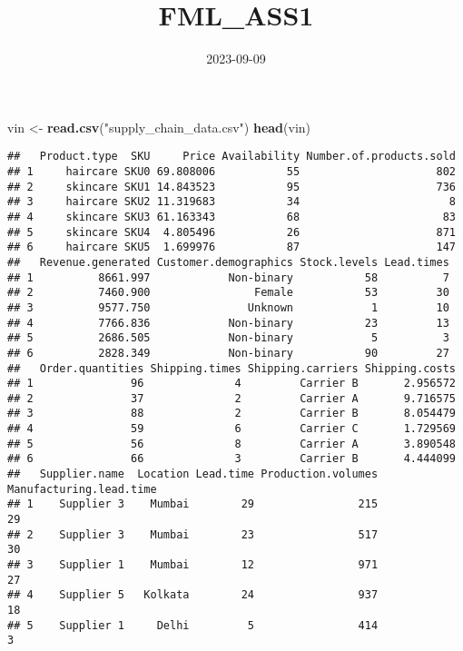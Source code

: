 \documentclass[
]{article}
\title{FML\_ASS1}
\author{}
\date{\vspace{-2.5em}2023-09-09}
\newenvironment{Shaded}{\begin{snugshade}}{\end{snugshade}}
\newcommand{\FunctionTok}[1]{\textcolor[rgb]{0.13,0.29,0.53}{\textbf{#1}}}
\newcommand{\NormalTok}[1]{#1}
\newcommand{\OtherTok}[1]{\textcolor[rgb]{0.56,0.35,0.01}{#1}}
\newcommand{\StringTok}[1]{\textcolor[rgb]{0.31,0.60,0.02}{#1}}
\begin{document}
\maketitle

\begin{Shaded}
\begin{Highlighting}[]
\NormalTok{vin }\OtherTok{\textless{}{-}} \FunctionTok{read.csv}\NormalTok{(}\StringTok{"supply\_chain\_data.csv"}\NormalTok{)}
\FunctionTok{head}\NormalTok{(vin)}
\end{Highlighting}
\end{Shaded}

\begin{verbatim}
##   Product.type  SKU     Price Availability Number.of.products.sold
## 1     haircare SKU0 69.808006           55                     802
## 2     skincare SKU1 14.843523           95                     736
## 3     haircare SKU2 11.319683           34                       8
## 4     skincare SKU3 61.163343           68                      83
## 5     skincare SKU4  4.805496           26                     871
## 6     haircare SKU5  1.699976           87                     147
##   Revenue.generated Customer.demographics Stock.levels Lead.times
## 1          8661.997            Non-binary           58          7
## 2          7460.900                Female           53         30
## 3          9577.750               Unknown            1         10
## 4          7766.836            Non-binary           23         13
## 5          2686.505            Non-binary            5          3
## 6          2828.349            Non-binary           90         27
##   Order.quantities Shipping.times Shipping.carriers Shipping.costs
## 1               96              4         Carrier B       2.956572
## 2               37              2         Carrier A       9.716575
## 3               88              2         Carrier B       8.054479
## 4               59              6         Carrier C       1.729569
## 5               56              8         Carrier A       3.890548
## 6               66              3         Carrier B       4.444099
##   Supplier.name  Location Lead.time Production.volumes Manufacturing.lead.time
## 1    Supplier 3    Mumbai        29                215                      29
## 2    Supplier 3    Mumbai        23                517                      30
## 3    Supplier 1    Mumbai        12                971                      27
## 4    Supplier 5   Kolkata        24                937                      18
## 5    Supplier 1     Delhi         5                414                       3

\end{verbatim}
\end{document}
